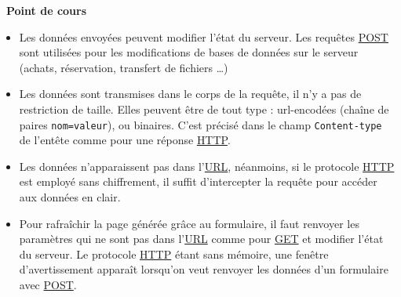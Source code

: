 \documentclass[
  11pt,
]{article}
\newcommand{\passthrough}[1]{#1}
\providecommand{\tightlist}{%
  \setlength{\itemsep}{0pt}\setlength{\parskip}{0pt}}
\newcounter{cours}
\newenvironment{cours}[1]
{\par \medskip   \addtocounter{cours}{1} \noindent  
\begin{bclogo}[arrondi =0.1,  ombre = true, barre=none, logo=\bcbook, marge=4]{~\textbf{Point de cours} \textbf{\thecours} {\itshape #1} }  \par}
{
\end{bclogo}
 \par \bigskip }
\begin{document}
\begin{cours}{}
\begin{itemize}
\tightlist
\item
  Les données envoyées peuvent modifier l'état du serveur. Les requêtes
  \href{https://developer.mozilla.org/fr/docs/Web/HTTP/M\%C3\%A9thode/POST}{POST}
  sont utilisées pour les modifications de bases de données sur le
  serveur (achats, réservation, transfert de fichiers \ldots)
\item
  Les données sont transmises dans le corps de la requête, il n'y a pas
  de restriction de taille. Elles peuvent être de tout type :
  url-encodées (chaîne de paires \passthrough{\lstinline!nom=valeur!}),
  ou binaires. C'est précisé dans le champ
  \passthrough{\lstinline!Content-type!} de l'entête comme pour une
  réponse
  \href{https://developer.mozilla.org/fr/docs/Glossaire/HTTP}{HTTP}.
\item
  Les données n'apparaissent pas dans
  l'\href{https://developer.mozilla.org/fr/docs/Glossaire/URL}{URL},
  néanmoins, si le protocole
  \href{https://developer.mozilla.org/fr/docs/Glossaire/HTTP}{HTTP} est
  employé sans chiffrement, il suffit d'intercepter la requête pour
  accéder aux données en clair.
\item
  Pour rafraîchir la page générée grâce au formulaire, il faut renvoyer
  les paramètres qui ne sont pas dans
  l'\href{https://developer.mozilla.org/fr/docs/Glossaire/URL}{URL}
  comme pour \url{GET} et modifier l'état du serveur. Le protocole
  \href{https://developer.mozilla.org/fr/docs/Glossaire/HTTP}{HTTP}
  étant sans mémoire, une fenêtre d'avertissement apparaît lorsqu'on
  veut renvoyer les données d'un formulaire avec
  \href{https://developer.mozilla.org/fr/docs/Web/HTTP/M\%C3\%A9thode/POST}{POST}.
\end{itemize}

\end{cours}
\end{document}
